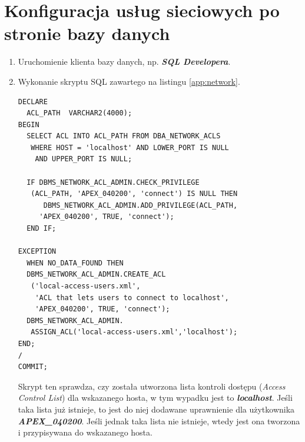 \documentclass[11pt,a4paper]{article}
\begin{document}
\appendix
\section{Konfiguracja usług sieciowych po stronie bazy danych} \label{app:conf_db}
\begin{enumerate}
\item Uruchomienie klienta bazy danych, np. \emph{\textbf{SQL Developera}}.
\item Wykonanie skryptu SQL zawartego na listingu \ref{app:network}.

\lstset{language=SQL}
\begin{lstlisting}[frame=single,caption=Skrypt PL/SQL włączający usługi sieciowe w bazie danych,label=app:network]
DECLARE
  ACL_PATH  VARCHAR2(4000);
BEGIN
  SELECT ACL INTO ACL_PATH FROM DBA_NETWORK_ACLS
   WHERE HOST = 'localhost' AND LOWER_PORT IS NULL 
    AND UPPER_PORT IS NULL;
   
  IF DBMS_NETWORK_ACL_ADMIN.CHECK_PRIVILEGE
   (ACL_PATH, 'APEX_040200', 'connect') IS NULL THEN
      DBMS_NETWORK_ACL_ADMIN.ADD_PRIVILEGE(ACL_PATH,
     'APEX_040200', TRUE, 'connect');
  END IF;
  
EXCEPTION
  WHEN NO_DATA_FOUND THEN
  DBMS_NETWORK_ACL_ADMIN.CREATE_ACL
   ('local-access-users.xml',
    'ACL that lets users to connect to localhost',
    'APEX_040200', TRUE, 'connect');
  DBMS_NETWORK_ACL_ADMIN.
   ASSIGN_ACL('local-access-users.xml','localhost');
END;
/
COMMIT;
\end{lstlisting}

Skrypt ten sprawdza, czy została utworzona lista kontroli dostępu (\emph{Access Control List}) dla wskazanego hosta, w tym wypadku jest to \emph{\textbf{localhost}}. Jeśli taka lista już istnieje, to jest do niej dodawane uprawnienie dla użytkownika \emph{\textbf{APEX\_040200}}. Jeśli jednak taka lista nie istnieje, wtedy jest ona tworzona i przypisywana do wskazanego hosta.

\end{enumerate}
\newpage
\end{document}
